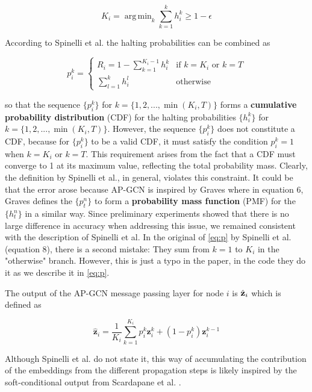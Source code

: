 \documentclass{gdl}
\DeclareMathOperator*{\argmin}{arg\,min}
\begin{document}
\begin{equation}
    K_i = \argmin_{k} \sum_{k=1}^{k} h_i^k \geq 1-\epsilon
\end{equation}

\noindent According to Spinelli et al. the halting probabilities can be combined as

\begin{equation}
    p_i^k = 
    \begin{cases}
    R_i = 1 - \sum_{k=1}^{K_i - 1} h_i^k & \text{if } k = K_i \text{ or } k = T \\
    \sum_{l=1}^{k} h_i^l & \text{otherwise}
    \end{cases}
    \label{eq:p}
\end{equation}

\noindent so that the sequence $\{p_i^k\}$ for $k=\{1,2,...,\min(K_i, T)\}$ forms a \textbf{cumulative probability distribution} (CDF) for the halting probabilities $\{h_i^k\}$ for $k=\{1,2,...,\min(K_i, T)\}$. However, the sequence $\{p_i^k\}$ does not constitute a CDF, because for $\{p_i^k\}$ to be a valid CDF, it must satisfy the condition $p_i^k = 1$ when $k = K_i$ or $k = T$. This requirement arises from the fact that a CDF must converge to 1 at its maximum value, reflecting the total probability mass. Clearly, the definition by Spinelli et al., in general, violates this constraint. It could be that the error arose because AP-GCN is inspired by Graves \cite{graves2017} where in equation 6, Graves defines the $\{p_t^n\}$ to form a \textbf{probability mass function} (PMF) for the $\{h_t^n\}$ in a similar way. Since preliminary experiments showed that there is no large difference in accuracy when addressing this issue, we remained consistent with the description of Spinelli et al. In the original of \autoref{eq:p} by Spinelli et al. (equation 8), there is a second mistake: They sum from $k=1$ to $K_i$ in the "otherwise" branch. However, this is just a typo in the paper, in the code they do it as we describe it in \autoref{eq:p}.

The output of the AP-GCN message passing layer for node $i$ is $\hat{\bf{z}}_i$ which is defined as

\begin{equation}
\hat{\mathbf{z}}_i = \frac{1}{K_i} \sum_{k=1}^{K_i} p_i^k \mathbf{z}^k_i + (1-p^k_i) \mathbf{z}_i^{k-1} 
\label{eq:aggregate}
\end{equation}

\noindent Although Spinelli et al. do not state it, this way of accumulating the contribution of the embeddings from the different propagation steps is likely inspired by the soft-conditional output from Scardapane et al. \cite{scardapane2020}.
\end{document}
